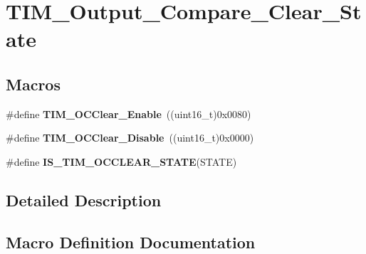 \hypertarget{group___t_i_m___output___compare___clear___state}{}\section{T\+I\+M\+\_\+\+Output\+\_\+\+Compare\+\_\+\+Clear\+\_\+\+State}
\label{group___t_i_m___output___compare___clear___state}
\subsection*{Macros}
\begin{DoxyCompactItemize}
\item 
\hypertarget{group___t_i_m___output___compare___clear___state_ga1b7bce48b3e1478aad98c95fbbe7a6e0}{}\#define {\bfseries T\+I\+M\+\_\+\+O\+C\+Clear\+\_\+\+Enable}~((uint16\+\_\+t)0x0080)\label{group___t_i_m___output___compare___clear___state_ga1b7bce48b3e1478aad98c95fbbe7a6e0}

\item 
\hypertarget{group___t_i_m___output___compare___clear___state_gadb09946cb5dded7520baf4b19173204d}{}\#define {\bfseries T\+I\+M\+\_\+\+O\+C\+Clear\+\_\+\+Disable}~((uint16\+\_\+t)0x0000)\label{group___t_i_m___output___compare___clear___state_gadb09946cb5dded7520baf4b19173204d}

\item 
\#define {\bfseries I\+S\+\_\+\+T\+I\+M\+\_\+\+O\+C\+C\+L\+E\+A\+R\+\_\+\+S\+T\+A\+T\+E}(S\+T\+A\+T\+E)
\end{DoxyCompactItemize}


\subsection{Detailed Description}


\subsection{Macro Definition Documentation}
\hypertarget{group___t_i_m___output___compare___clear___state_ga5297586b42da9263ac4f767c83202fed}{}
